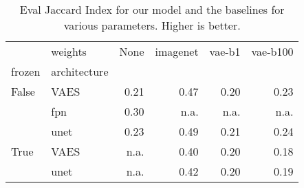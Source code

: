 \begin{table}[ht]
\centering
\caption{Eval Jaccard Index for our model and the baselines for various parameters. Higher is better.}
\label{tab:baseline_results}
\begin{tabular}{llrrrr}
\toprule
     & weights &  None &  imagenet &  vae-b1 &  vae-b100 \\
frozen & architecture &       &           &         &           \\
\midrule
False & VAES &  0.21 &      0.47 &    0.20 &      0.23 \\
     & fpn &  0.30 &      n.a. &    n.a. &      n.a. \\
     & unet &  0.23 &      0.49 &    0.21 &      0.24 \\
True & VAES &  n.a. &      0.40 &    0.20 &      0.18 \\
     & unet &  n.a. &      0.42 &    0.20 &      0.19 \\
\bottomrule
\end{tabular}
\end{table}
